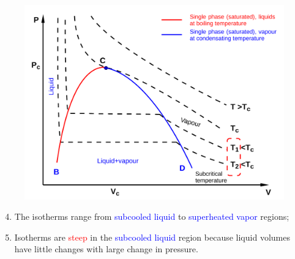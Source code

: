 \documentclass[10pt,compress]{beamer}
\begin{document}
\begin{frame}
\begin{columns}
\begin{column}[l]{0.5\linewidth}
{\begin{figure}
\begin{center}
          \includegraphics[width=\columnwidth,clip]{./../Pics/PV_Diagram2}
        \end{center}
      \end{figure}}
      \begin{enumerate}\setcounter{enumi}{3}
        \item<3-> The isotherms range from \textcolor{blue}{subcooled liquid} to \textcolor{blue}{superheated vapor} regions; 
        \item<3-> Isotherms are \textcolor{red}{steep} in the \textcolor{blue}{subcooled liquid}  region because liquid volumes have little changes with large change in pressure.
      \end{enumerate}
    \end{column}
  \end{columns}
\end{frame}
\normalsize
\end{document}
